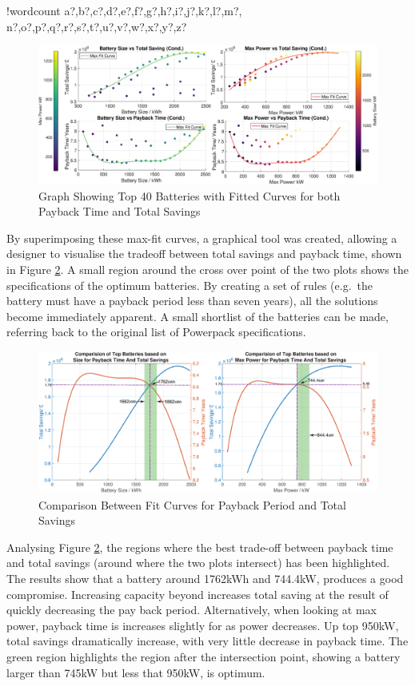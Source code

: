 \documentclass[fontsize=9.5pt]{extarticle}
\numberwithin{figure}{section} %
\newcounter{words}
\newenvironment{counted}{%
  \setcounter{words}{0}
  \SearchList!{wordcount}{\stepcounter{words}}
    {a?,b?,c?,d?,e?,f?,g?,h?,i?,j?,k?,l?,m?,
    n?,o?,p?,q?,r?,s?,t?,u?,v?,w?,x?,y?,z?}
  \UndoBoundary{'}
  \SearchOrder{p;}}{%
  \StopSearching}
\begin{document}
\begin{counted}
\begin{figure}[H]
\centering
\includegraphics[trim = 0 0 0 0, clip, width=1\textwidth]{mxfit.eps}
\caption{Graph Showing Top 40 Batteries with Fitted Curves for both Payback Time and Total Savings}
\label{SPA2}
\vspace{-20pt}
\end{figure}

By superimposing these max-fit curves, a graphical tool was created,
allowing a designer to visualise the tradeoff between total savings and
payback time, shown in Figure \ref{SRTSPB5}. A small region around the
cross over point of the two plots shows the specifications of the
optimum batteries. By creating a set of rules (e.g.~the battery must
have a payback period less than seven years), all the solutions become
immediately apparent. A small shortlist of the batteries can be made,
referring back to the original list of Powerpack specifications.

\begin{figure}[H]
 \centering
 \includegraphics[trim = 0 0 0 0, clip, width=1\textwidth]{mxfitplt.eps}
 \caption{Comparison Between Fit Curves for Payback Period and Total Savings}
 \label{SRTSPB5}
 \vspace{-20pt}
 \end{figure}

Analysing Figure \ref{SRTSPB5}, the regions where the best trade-off
between payback time and total savings (around where the two plots
intersect) has been highlighted. The results show that a battery around
1762kWh and 744.4kW, produces a good compromise. Increasing capacity
beyond increases total saving at the result of quickly decreasing the
pay back period. Alternatively, when looking at max power, payback time
is increases slightly for as power decreases. Up top 950kW, total
savings dramatically increase, with very little decrease in payback
time. The green region highlights the region after the intersection
point, showing a battery larger than 745kW but less that 950kW, is
optimum.


\end{counted}
\end{document}
